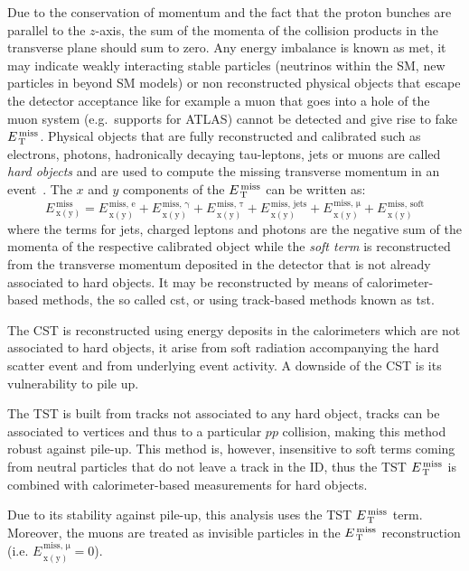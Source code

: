 Due to the conservation of momentum and the fact that the proton bunches are
parallel to the $z$-axis, the sum of the momenta of the collision products in
the transverse plane should sum to zero. Any energy imbalance is known as
\gls{met}, it may indicate weakly interacting stable particles (neutrinos within
the SM, new particles in beyond SM models) or non reconstructed physical objects
that escape the detector acceptance like for example a muon that goes into a
hole of the muon system (e.g.\ supports for ATLAS) cannot be detected and give
rise to fake $E_\mathrm{\, T}^\mathrm{\, miss}$.  Physical objects that are fully reconstructed and
calibrated such as electrons, photons, hadronically decaying tau-leptons, jets
or muons are called \emph{hard objects} and are used to compute the missing
transverse momentum in an event~\cite{MET}. The $x$ and $y$ components of the
$E_\mathrm{\, T}^\mathrm{\, miss}$ can be written as:
\begin{equation}
  \label{eq:62}
  E_\mathrm{\, x(y)}^\mathrm{\, miss} = E_\mathrm{\, x(y)}^\mathrm{\, miss,\, e} +
  E_\mathrm{\, x(y)}^\mathrm{\, miss,\, \gamma} + E_\mathrm{\, x(y)}^\mathrm{\,
    miss,\, \tau} + E_\mathrm{\, x(y)}^\mathrm{\, miss,\, \text{jets}} +
  E_\mathrm{\, x(y)}^\mathrm{\, miss,\, \mu} + E_\mathrm{\, x(y)}^\mathrm{\, miss,\,
    \text{soft}}
\end{equation}
where the terms for jets, charged leptons and photons are the negative sum of
the momenta of the respective calibrated object while the \emph{soft term} is
reconstructed from the transverse momentum deposited in the detector that is not
already associated to hard objects. It may be reconstructed by means of
calorimeter-based methods, the so called \gls{cst}, or using track-based methods
known as \gls{tst}.

The CST is reconstructed using energy deposits in the calorimeters which are not
associated to hard objects, it arise from soft radiation accompanying the hard
scatter event and from underlying event activity. A downside of the CST is its
vulnerability to pile up.

The TST is built from tracks not associated to any hard object, tracks can be
associated to vertices and thus to a particular $pp$ collision, making this
method robust against pile-up. This method is, however, insensitive to soft
terms coming from neutral particles that do not leave a track in the ID, thus
the TST $E_\mathrm{\, T}^\mathrm{\, miss}$ is combined with calorimeter-based measurements for hard objects.

Due to its stability against pile-up, this analysis uses the TST $E_\mathrm{\, T}^\mathrm{\, miss}$ term.
Moreover, the muons are treated as invisible particles in the $E_\mathrm{\, T}^\mathrm{\, miss}$
reconstruction (i.e. $E_\mathrm{\, x(y)}^\mathrm{\, miss,\, \mu} = 0$).
